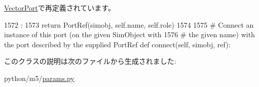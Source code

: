 \hyperlink{classm5_1_1params_1_1VectorPort_a0170489846d992db3fea03df9156216b}{VectorPort}で再定義されています。


\begin{DoxyCode}
1572                              :
1573         return PortRef(simobj, self.name, self.role)
1574 
1575     # Connect an instance of this port (on the given SimObject with
1576     # the given name) with the port described by the supplied PortRef
    def connect(self, simobj, ref):
\end{DoxyCode}


このクラスの説明は次のファイルから生成されました:\begin{DoxyCompactItemize}
\item 
python/m5/\hyperlink{params_8py}{params.py}\end{DoxyCompactItemize}
